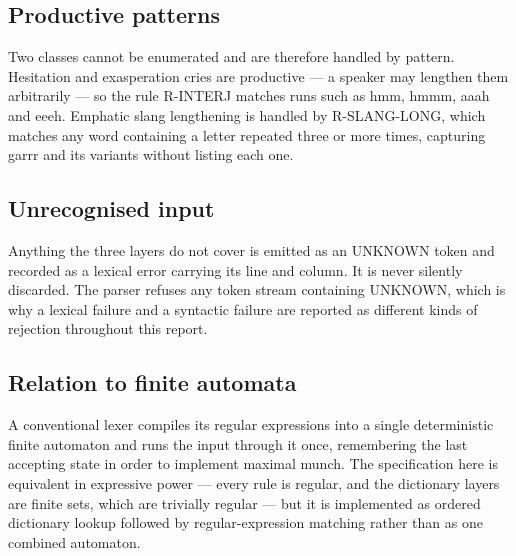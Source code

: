 \documentclass[11pt,a4paper]{article}
\begin{document}
\subsection{Productive patterns}
Two classes cannot be enumerated and are therefore handled by pattern. Hesitation and exasperation cries are productive --- a speaker may lengthen them arbitrarily --- so the rule R-INTERJ matches runs such as hmm, hmmm, aaah and eeeh. Emphatic slang lengthening is handled by R-SLANG-LONG, which matches any word containing a letter repeated three or more times, capturing garrr and its variants without listing each one.

\subsection{Unrecognised input}
Anything the three layers do not cover is emitted as an UNKNOWN token and recorded as a lexical error carrying its line and column. It is never silently discarded. The parser refuses any token stream containing UNKNOWN, which is why a lexical failure and a syntactic failure are reported as different kinds of rejection throughout this report.

\subsection{Relation to finite automata}
A conventional lexer compiles its regular expressions into a single deterministic finite automaton and runs the input through it once, remembering the last accepting state in order to implement maximal munch. The specification here is equivalent in expressive power --- every rule is regular, and the dictionary layers are finite sets, which are trivially regular --- but it is implemented as ordered dictionary lookup followed by regular-expression matching rather than as one combined automaton.
\end{document}
